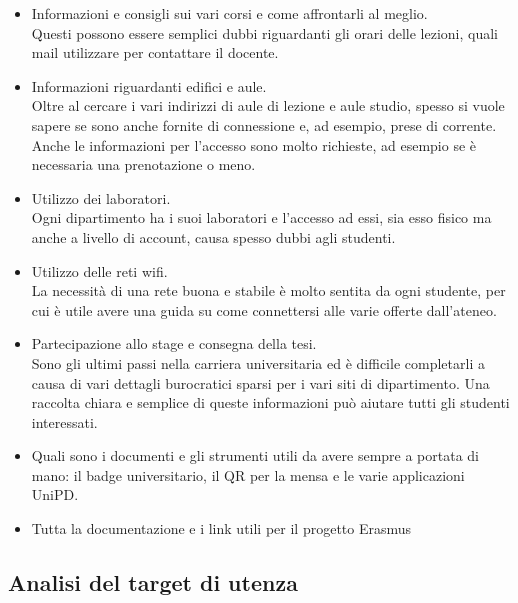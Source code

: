 \begin{itemize}
    \item Informazioni e consigli sui vari corsi e come affrontarli al meglio. \\ Questi possono essere semplici dubbi riguardanti gli orari delle lezioni, quali mail utilizzare per contattare il docente.
    \item Informazioni riguardanti edifici e aule.\\ Oltre al cercare i vari indirizzi di aule di lezione e aule studio, spesso si vuole sapere se sono anche fornite di connessione e, ad esempio, prese di corrente. Anche le informazioni per l'accesso sono molto richieste, ad esempio se è necessaria una prenotazione o meno. 
    \item Utilizzo dei laboratori. \\ Ogni dipartimento ha i suoi laboratori e l'accesso ad essi, sia esso fisico ma anche a livello di account, causa spesso dubbi agli studenti.
    \item Utilizzo delle reti wifi. \\ La necessità di una rete buona e stabile è molto sentita da ogni studente, per cui è utile avere una guida su come connettersi alle varie offerte dall'ateneo.   
    \item Partecipazione allo stage e consegna della tesi. \\ Sono gli ultimi passi nella carriera universitaria ed è difficile completarli a causa di vari dettagli burocratici sparsi per i vari siti di dipartimento. Una raccolta chiara e semplice di queste informazioni può aiutare tutti gli studenti interessati.
    \item Quali sono i documenti e gli strumenti utili da avere sempre a portata di mano: il badge universitario, il QR per la mensa e le varie applicazioni UniPD.
    \item Tutta la documentazione e i link utili per il progetto Erasmus
\end{itemize}

\subsection{Analisi del target di utenza}

